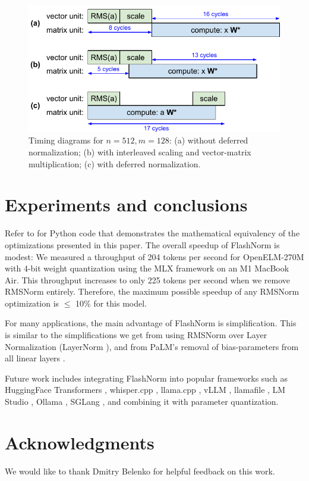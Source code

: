 \documentclass{article}
\begin{document}
\begin{figure}[h!] \centering
  \includegraphics[scale=1.0]{../doc/fig/flashNorm_fig8.pdf}
  \caption{Timing diagrams for $n = 512, m = 128$: (a) without deferred normalization; (b) with interleaved scaling and vector-matrix multiplication; (c) with deferred normalization.}
\label{fig8} \end{figure}

\section{Experiments and conclusions}
Refer to \citep{hfFlashNorm, tricks} for Python code that demonstrates the mathematical equivalency of the optimizations presented in this paper. The overall speedup of FlashNorm is modest: We measured a throughput of 204 tokens per second for OpenELM-270M with 4-bit weight quantization using the MLX framework on an M1 MacBook Air. This throughput increases to only 225 tokens per second when we remove RMSNorm entirely. Therefore, the maximum possible speedup of any RMSNorm optimization is $\leq$ 10\% for this model.

For many applications, the main advantage of FlashNorm is simplification. This is similar to the simplifications we get from using RMSNorm over Layer Normalization (LayerNorm \citep{layerNorm}), and from PaLM's removal of bias-parameters from all linear layers  \citep{PaLM}.

Future work includes integrating FlashNorm into popular frameworks such as HuggingFace Transformers \citep{HFtransformers}, whisper.cpp \citep{whisper-cpp}, llama.cpp \citep{llama-cpp}, vLLM \citep{vLLM}, llamafile \citep{llamafile}, LM Studio \citep{lmstudio}, Ollama \citep{ollama}, SGLang \citep{sglang}, and combining it with parameter quantization.

\section*{Acknowledgments}
We would like to thank Dmitry Belenko for helpful feedback on this work.
\end{document}
